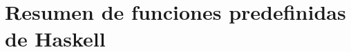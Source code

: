 

\newcommand{\verba}[1]{%
  \fbox{\textcolor{blue}{\ \texttt{#1}\phantom{I}}}}


\section{Resumen de funciones predefinidas de Haskell}

